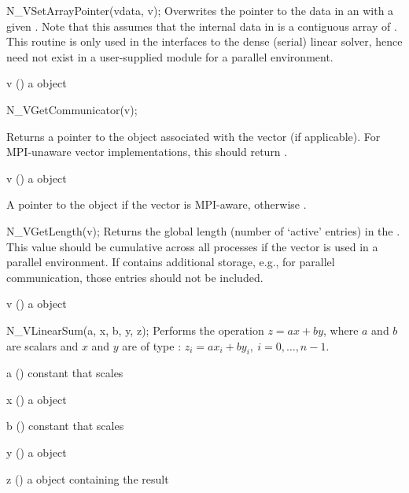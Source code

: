 {
  N\_VSetArrayPointer(vdata, v);
}
{
  Overwrites the pointer to the data in an  with a given .
  Note that this assumes that the internal data in  is a contiguous
  array of . This routine is only used in the interfaces to the dense
  (serial) linear solver, hence need not exist in a user-supplied {\nvector} module
  for a parallel environment.
}
{
  \begin{args}[v]
  \item[v] () a {\nvector} object
  \end{args}
}
{}
{}

{
  N\_VGetCommunicator(v);
}
{

  Returns a pointer to the  object associated with the
  vector (if applicable). For MPI-unaware vector implementations, this
  should return .
}
{
  \begin{args}[v]
  \item[v] () a {\nvector} object
  \end{args}
}
{
  A  pointer to the  object if the vector is MPI-aware,
  otherwise .
}
{}

{
  N\_VGetLength(v);
}
{
  Returns the global length (number of `active' entries) in the
  {\nvector} .  This value should be cumulative across all
  processes if the vector is used in a parallel environment.  If 
  contains additional storage, e.g., for parallel communication, those
  entries should not be included.
}
{
  \begin{args}[v]
  \item[v] () a {\nvector} object
  \end{args}
}
{
}
{}

{
  N\_VLinearSum(a, x, b, y, z);
}
{
  Performs the operation $z = a x + b y$, where $a$ and $b$ are 
  scalars and $x$ and $y$ are of type :
  $z_i = a x_i + b y_i, \: i=0,\ldots,n-1$.
}
{
  \begin{args}[a]
  \item[a] () constant that scales 
  \item[x] () a {\nvector} object
  \item[b] () constant that scales 
  \item[y] () a {\nvector} object
  \item[z] () a {\nvector} object containing the result
  \end{args}
}
{}
{}

